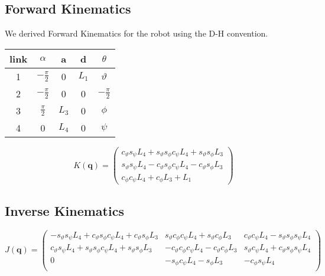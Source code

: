 \documentclass[11pt, a4paper]{article}
\begin{document}
    \subsection{Forward Kinematics}
    We derived Forward Kinematics for the robot using the D-H convention.
    \begin{center}
        \begin{tabular}{ |c|c|c|c|c| }
            \hline
            link & $\alpha$ & a & d & $\theta$\\
            \hline
            1 & $-\frac{\pi}{2}$ & 0 & $L_1$ & $\vartheta$\\
            2 & $-\frac{\pi}{2}$ & 0 & 0 & $-\frac{\pi}{2}$\\
            3 & $\frac{\pi}{2}$ & $L_3$ & 0 & $\phi$\\
            4 & 0 & $L_4$ & 0 & $\psi$\\
            \hline
        \end{tabular}
    \end{center}
    

    $$
    K(\textbf{q}) = 
        \begin{pmatrix}
            c_{\vartheta}s_{\psi}L_4 + s_{\vartheta}s_{\phi}c_{\psi}L_4 + s_{\vartheta}s_{\phi}L_3\\
            s_{\vartheta}s_{\psi}L_4 - c_{\vartheta}s_{\phi}c_{\psi}L_4 - c_{\vartheta}s_{\phi}L_3\\
            c_{\phi}c_{\psi}L_4 + c_{\phi}L_3 + L_1
        \end{pmatrix}
    $$
    \subsection{Inverse Kinematics}
    $$
    J(\textbf{q}) =
        \begin{pmatrix}
           -s_{\vartheta}s_{\psi}L_4 + c_{\vartheta}s_{\phi}c_{\psi}L_4 + c_{\vartheta}s_{\phi}L_3 & 
            s_{\vartheta}c_{\phi}c_{\psi}L_4 + s_{\vartheta}c_{\phi}L_3 & 
            c_{\vartheta}c_{\psi}L_4 - s_{\vartheta}s_{\phi}s_{\psi}L_4\\

            c_{\vartheta}s_{\psi}L_4 + s_{\vartheta}s_{\phi}c_{\psi}L_4 + s_{\vartheta}s_{\phi}L_3 &
           -c_{\vartheta}c_{\phi}c_{\psi}L_4 - c_{\vartheta}c_{\phi}L_3 &
            s_{\vartheta}c_{\psi}L_4 + c_{\vartheta}s_{\phi}s_{\psi}L_4\\

            0 &
           -s_{\phi}c_{\psi}L_4 - s_{\phi}L_3 &
           -c_{\phi}s_{\psi}L_4\\
        \end{pmatrix}
    $$
\end{document}
